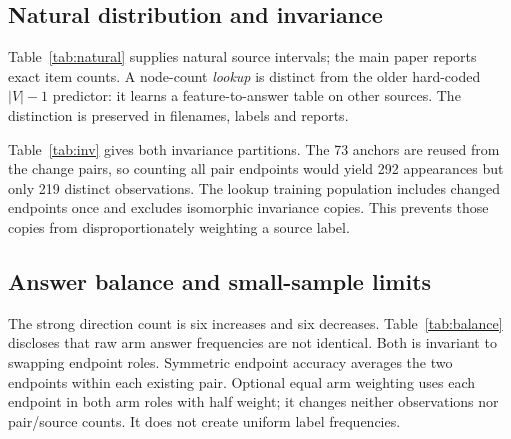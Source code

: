 \documentclass[10pt,twocolumn,letterpaper]{article}
\begin{document}
\begin{table}[H]
\centering\small
\caption{Every strong change pair; 12 pairs from eight sources.
The final column is the exact per-pair result, not an average
over generated variants. BFS and union-find have Both=1 on every row.
The machine audit additionally supplies full feature signatures,
source-held-out lookup support and predictions.}
\label{tab:strong}

\end{table}

\begin{table}[H]
\centering\small
\caption{Natural graph source-macro accuracy in percent, with
descriptive whole-source percentile intervals. All 73 items and
24 sources are retained. Lookup training excludes the test source
and is separate from hypothetical graphs.}
\label{tab:natural}

\end{table}

\subsection{Natural distribution and invariance}
Table~\ref{tab:natural} supplies natural source intervals; the main
paper reports exact item counts. A node-count \emph{lookup} is
distinct from the older hard-coded $|V|-1$ predictor: it learns a
feature-to-answer table on other sources. The distinction is preserved
in filenames, labels and reports.

Table~\ref{tab:inv} gives both invariance partitions. The 73 anchors
are reused from the change pairs, so counting all pair endpoints
would yield 292 appearances but only 219 distinct observations.
The lookup training population includes changed endpoints once and
excludes isomorphic invariance copies. This prevents those copies
from disproportionately weighting a source label.

\begin{table}[H]
\centering\small
\caption{Both-correct on invariance pairs. Strong and degree-visible
sources overlap with the corresponding changed-answer partitions.
Stable predictions need not be correct.}
\label{tab:inv}

\end{table}

\subsection{Answer balance and small-sample limits}
The strong direction count is six increases and six decreases.
Table~\ref{tab:balance} discloses that raw arm answer frequencies
are not identical. Both is invariant to swapping endpoint roles.
Symmetric endpoint accuracy averages the two endpoints within
each existing pair. Optional equal arm weighting uses each endpoint
in both arm roles with half weight; it changes neither observations
nor pair/source counts. It does not create uniform label frequencies.
\end{document}

